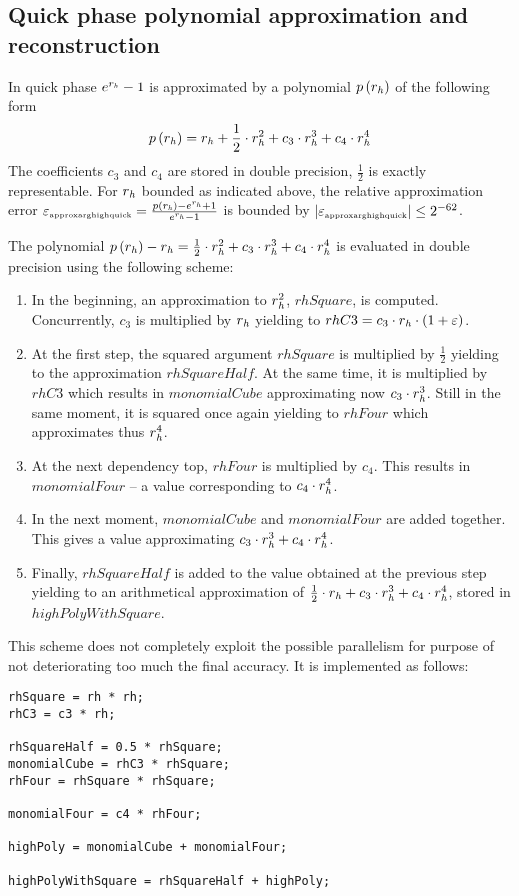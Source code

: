 \subsection{Quick phase polynomial approximation and reconstruction}
In quick phase $e^{r_\hi} - 1$ is approximated by a polynomial
$p\left( r_\hi \right)$ of the following form
$$p\left( r_\hi \right) = r_\hi + \frac{1}{2} \cdot r_\hi^2 + c_3
\cdot r_\hi^3 + c_4 \cdot r_\hi^4$$ The coefficients $c_3$ and $c_4$
are stored in double precision, $\frac{1}{2}$ is exactly
representable. For $r_\hi$ bounded as indicated above, the relative
approximation error $\epsilon_{\mbox{\tiny approxarghighquick}} =
\frac{p\left( r_\hi \right) - e^{r_\hi} + 1}{e^{r_\hi} - 1}$ is bounded by 
$\left \vert \epsilon_{\mbox{\tiny approxarghighquick}} \right \vert \leq 2^{-62}$.

The polynomial $p\left(r_\hi \right) - r_\hi = \frac{1}{2} \cdot
r_\hi^2 + c_3 \cdot r_\hi^3 + c_4 \cdot r_\hi^4$ is evaluated in
double precision using the following scheme:
\begin{enumerate}
\item In the beginning, an approximation to $r_\hi^2$, $rhSquare$, is computed. Concurrently, 
$c_3$ is multiplied by $r_\hi$ yielding to $rhC3 = c_3 \cdot r_\hi \cdot \left( 1 + \epsilon \right)$.
\item At the first step, the squared argument $rhSquare$ is multiplied
by $\frac{1}{2}$ yielding to the approximation $rhSquareHalf$. At the
same time, it is multiplied by $rhC3$ which results in $monomialCube$
approximating now $c_3 \cdot r_\hi^3$. Still in the same moment, it is
squared once again yielding to $rhFour$ which approximates thus
$r_\hi^4$.
\item At the next dependency top, $rhFour$ is multiplied by
$c_4$. This results in $monomialFour$ -- a value corresponding to $c_4
\cdot r_\hi^4$.
\item In the next moment, $monomialCube$ and $monomialFour$ are added
together. This gives a value approximating $c_3 \cdot r_\hi^3 + c_4
\cdot r_\hi^4$.
\item Finally, $rhSquareHalf$ is added to the value obtained at the
previous step yielding to an arithmetical approximation of
$\frac{1}{2} \cdot r_\hi + c_3 \cdot r_\hi^3 + c_4 \cdot r_\hi^4$,
stored in $highPolyWithSquare$.
\end{enumerate}
This scheme does not completely exploit the possible parallelism for
purpose of not deteriorating too much the final accuracy. It is
implemented as follows:
\begin{lstlisting}[caption={Quick phase polynomial evaluation - high order terms},firstnumber=1]
rhSquare = rh * rh;
rhC3 = c3 * rh;

rhSquareHalf = 0.5 * rhSquare;
monomialCube = rhC3 * rhSquare;
rhFour = rhSquare * rhSquare;

monomialFour = c4 * rhFour;

highPoly = monomialCube + monomialFour;

highPolyWithSquare = rhSquareHalf + highPoly;
\end{lstlisting}
